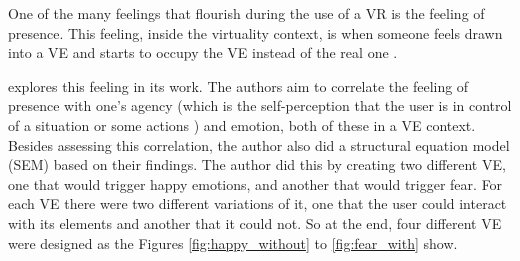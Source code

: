 One of the many feelings that flourish during the use of a VR is the feeling of presence. This feeling, inside the virtuality context, is when someone feels drawn into a VE and starts to occupy the VE instead of the real one \cite{cummings2016immersive}.

 explores this feeling in its work. The authors aim to correlate the feeling of presence with one's agency (which is the self-perception that the user is in control of a situation or some actions \cite{farrer2002experiencing}) and emotion, both of these in a VE context. Besides assessing this correlation, the author also did a structural equation model (SEM) based on their findings. The author did this by creating two different VE, one that would trigger happy emotions, and another that would trigger fear. For each VE there were two different variations of it, one that the user could interact with its elements and another that it could not. So at the end, four different VE were designed as the Figures \ref{fig:happy_without} to \ref{fig:fear_with} show.

